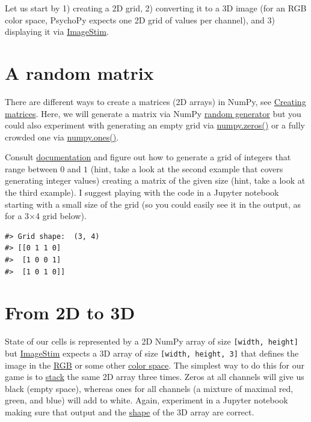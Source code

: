 \documentclass[
]{book}
\begin{document}
Let us start by 1) creating a 2D grid, 2) converting it to a 3D image (for an RGB color space, PsychoPy expects one 2D grid of values per channel), and 3) displaying it via \href{https://psychopy.org/api/visual/imagestim.html\#psychopy.visual.ImageStim}{ImageStim}.

\hypertarget{a-random-matrix}{%
\section{A random matrix}\label{a-random-matrix}}

There are different ways to create a matrices (2D arrays) in NumPy, see \href{https://numpy.org/doc/stable/user/absolute_beginners.html\#creating-matrices}{Creating matrices}. Here, we will generate a matrix via NumPy \href{https://numpy.org/doc/stable/reference/random/generator.html}{random generator} but you could also experiment with generating an empty grid via \href{https://numpy.org/doc/stable/reference/generated/numpy.zeros.html}{numpy.zeros()} or a fully crowded one via \href{https://numpy.org/doc/stable/reference/generated/numpy.ones.html?highlight=ones}{numpy.ones()}.

Consult \href{https://numpy.org/doc/stable/reference/random/generator.html}{documentation} and figure out how to generate a grid of integers that range between \(0\) and \(1\) (hint, take a look at the second example that covers generating integer values) creating a matrix of the given size (hint, take a look at the third example). I suggest playing with the code in a Jupyter notebook starting with a small size of the grid (so you could easily see it in the output, as for a 3×4 grid below).

\begin{verbatim}
#> Grid shape:  (3, 4)
#> [[0 1 1 0]
#>  [1 0 0 1]
#>  [1 0 1 0]]
\end{verbatim}

\hypertarget{from-2d-to-3d}{%
\section{From 2D to 3D}\label{from-2d-to-3d}}

State of our cells is represented by a 2D NumPy array of size \texttt{{[}width,\ height{]}} but \href{https://psychopy.org/api/visual/imagestim.html}{ImageStim} expects a 3D array of size \texttt{{[}width,\ height,\ 3{]}} that defines the image in the \href{https://psychopy.org/general/colours.html\#rgb-color-space}{RGB} or some other \href{https://psychopy.org/general/colours.html}{color space}. The simplest way to do this for our game is to \href{https://numpy.org/doc/stable/reference/generated/numpy.stack.html?highlight=numpy\%20stack\#numpy-stack}{stack} the same 2D array three times. Zeros at all channels will give us black (empty space), whereas ones for all channels (a mixture of maximal red, green, and blue) will add to white. Again, experiment in a Jupyter notebook making sure that output and the \href{https://numpy.org/doc/stable/reference/generated/numpy.ndarray.shape.html}{shape} of the 3D array are correct.
\end{document}
